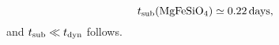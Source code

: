 \documentclass[12pt,english,preprint]{aastex}
\begin{document}
\begin{equation}
t_{{\rm sub}}({\rm MgFeSiO_{4})}\simeq0.22\,{\rm days\mbox{,}}
\end{equation}
and $t_{{\rm sub}}\ll t_{{\rm dyn}}$ follows.









\end{document}
